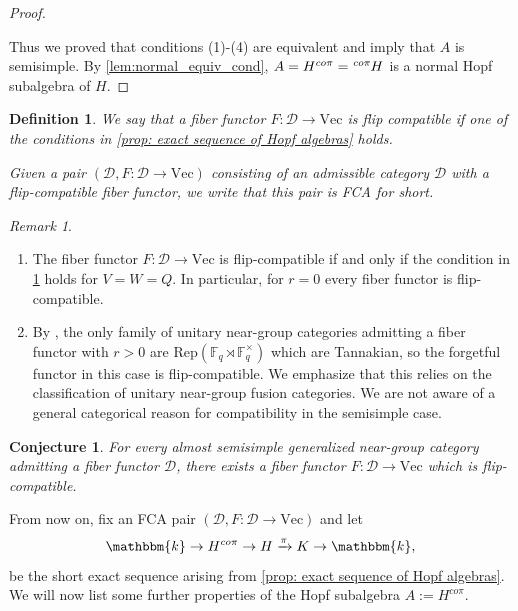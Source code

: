 \documentclass{amsart}
\theoremstyle{plain}%
\newtheorem{conj}[lemma]{Conjecture}
\newtheorem{definition}[lemma]{Definition}
\theoremstyle{remark}
\newtheorem{rem}[lemma]{Remark}
\newcommand{\1}{\mathbbm{1}}
\newcommand{\D}{\mathcal{D}}
\newcommand{\Rep}{\mathrm{Rep}}
\newcommand{\Vect}{\mathrm{Vec}}
\newcommand{\kk}{\mathbbm{k}}
\newcommand{\prescr}[2]{\tensor*[^{#1}]{#2}{}}
\begin{document}
\begin{proof}
\begin{enumerate}
        \end{enumerate}
Thus we proved that conditions (1)-(4) are equivalent and imply that $A$ is semisimple. By \cref{lem:normal_equiv_cond}, $A=H^{co \pi}=\prescr{co \pi}{H}$ is a normal Hopf subalgebra of $H$.

  
       \end{proof}

    \begin{definition}\label{def: flip-compatible fiber functor}
        We say that a fiber functor $F:\D\to \Vect$ is \textit{flip compatible} if one of the conditions in \cref{prop: exact sequence of Hopf algebras} holds. 
        
        Given a pair $(\D, F:\D\to \Vect)$ consisting of an admissible category $\D$ with a flip-compatible fiber functor, we write that this pair is \textit{FCA} for short.
    \end{definition}  
    
    \begin{rem}\label{rmk:flip_compatible}
    
    \mbox{}
    
    \begin{enumerate}
        \item The fiber functor $F:\D\to \Vect$ is flip-compatible if and only if the condition in \cref{def: flip-compatible fiber functor} holds for $V=W=Q$. In particular, for $r=0$ every fiber functor is flip-compatible.

        \item By \cite{EG2}, the only family of unitary near-group categories admitting a fiber functor with $r>0$ are $\Rep(\mathbb F_q\rtimes \mathbb F_q^\times)$ which are Tannakian, so the forgetful functor in this case is flip-compatible. We emphasize that this relies on the classification of unitary near-group fusion categories. We are not aware of a general categorical reason for compatibility in the semisimple case.
    \end{enumerate}
       
    \end{rem}
        \begin{conj}
        For every almost semisimple generalized near-group category admitting a fiber functor $\D$, there exists a fiber functor $F:\D\to \Vect$ which is flip-compatible.
    \end{conj} 

        From now on, fix an FCA pair $(\D, F:\D\to \Vect)$ and let        $$
            \kk\to H^{co \pi}\to H\xrightarrow{\pi} K\to \kk,
        $$ be the short exact sequence arising from \cref{prop: exact sequence of Hopf algebras}. 
        We will now list some further properties of the Hopf subalgebra $A:=H^{co \pi}$.
 
\end{document}
